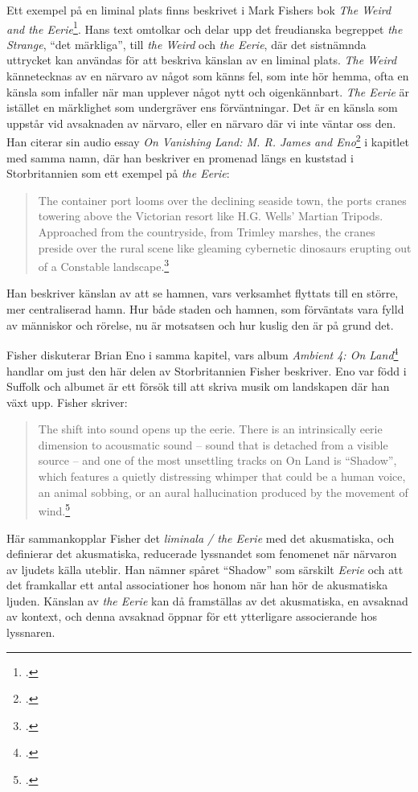 \documentclass{article}
\begin{document}
Ett exempel på en liminal plats finns beskrivet i Mark Fishers bok \emph{The Weird and the
Eerie}\footcite[8-13]{Fisher}. Hans text omtolkar och delar upp det freudianska begreppet \emph{the Strange},
``det märkliga'', till \emph{the Weird} och \emph{the Eerie}, där det sistnämnda uttrycket kan användas för
att beskriva känslan av en liminal plats. \emph{The Weird} kännetecknas av en närvaro av något som känns fel,
som inte hör hemma, ofta en känsla som infaller när man upplever något nytt och oigenkännbart. \emph{The
Eerie} är istället en märklighet som undergräver ens förväntningar. Det är en känsla som uppstår vid
avsaknaden av närvaro, eller en närvaro där vi inte väntar oss den. Han citerar sin audio essay \emph{On
Vanishing Land: M. R. James and Eno}\footcite{onvanishingland} i kapitlet med samma namn, där han beskriver en
promenad längs en kuststad i Storbritannien som ett exempel på \emph{the Eerie}:

\begin{quote}
The container port looms over the declining seaside town, the ports cranes towering above the Victorian resort
like H.G. Wells' Martian Tripods. Approached from the countryside, from Trimley marshes, the cranes preside
over the rural scene like gleaming cybernetic dinosaurs erupting out of a Constable
landscape.\footcite[76]{Fisher} 
\end{quote}

Han beskriver känslan av att se hamnen, vars verksamhet flyttats till en större, mer centraliserad hamn. 
Hur både staden och hamnen, som förväntats vara fylld av människor och rörelse, nu är motsatsen och hur kuslig
den är på grund det.

Fisher diskuterar Brian Eno i samma kapitel, vars album \emph{Ambient 4: On Land}\footcite{EnoLand} handlar om
just den här delen av Storbritannien Fisher beskriver. Eno var född i Suffolk och albumet är ett försök till
att skriva musik om landskapen där han växt upp. Fisher skriver:
\pagebreak
\begin{quote}
The shift into sound opens up the eerie. There is an intrinsically eerie dimension to acousmatic sound -- sound
that is detached from a visible source -- and one of the most unsettling tracks on On Land is ``Shadow'', which
features a quietly distressing whimper that could be a human voice, an animal sobbing, or an aural
hallucination produced by the movement of wind.\footcite[81]{Fisher}
\end{quote}
Här sammankopplar Fisher det \emph{liminala / the Eerie} med det akusmatiska, och definierar det akusmatiska, reducerade
lyssnandet som fenomenet när närvaron av ljudets källa uteblir. Han nämner spåret ``Shadow'' som särskilt \emph{Eerie}
och att det framkallar ett antal associationer hos honom när han hör de akusmatiska ljuden. Känslan av
\emph{the Eerie} kan då framställas av det akusmatiska, en avsaknad av kontext, och denna avsaknad öppnar för
ett ytterligare associerande hos lyssnaren. 
\end{document}
